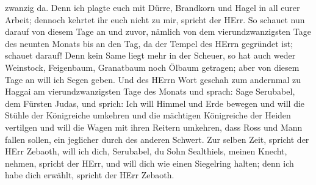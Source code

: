 zwanzig da.  Denn ich plagte euch mit Dürre, Brandkorn und
Hagel in all eurer Arbeit; dennoch kehrtet ihr euch nicht zu mir,
spricht der HErr.  So schauet nun darauf von diesem Tage an
und zuvor, nämlich von dem vierundzwanzigsten Tage des neunten Monats
bis an den Tag, da der Tempel des HErrn gegründet ist; schauet darauf!
 Denn kein Same liegt mehr in der Scheuer, so hat auch
weder Weinstock, Feigenbaum, Granatbaum noch Ölbaum getragen; aber von
diesem Tage an will ich Segen geben.  Und des HErrn Wort
geschah zum andernmal zu Haggai am vierundzwanzigsten Tage des Monats
und sprach:  Sage Serubabel, dem Fürsten Judas, und sprich:
Ich will Himmel und Erde bewegen  und will die Stühle der
Königreiche umkehren und die mächtigen Königreiche der Heiden vertilgen
und will die Wagen mit ihren Reitern umkehren, dass Ross und Mann fallen
sollen, ein jeglicher durch des anderen Schwert.  Zur
selben Zeit, spricht der HErr Zebaoth, will ich dich, Serubabel, du Sohn
Sealthiels, meinen Knecht, nehmen, spricht der HErr, und will dich wie
einen Siegelring halten; denn ich habe dich erwählt, spricht der HErr
Zebaoth.
